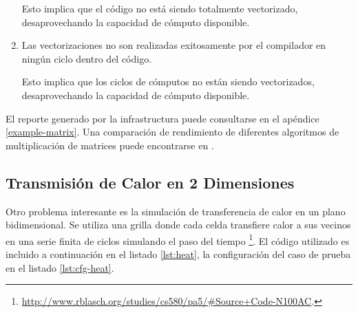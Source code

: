\documentclass[a4paper]{report}
\begin{document}
\begin{enumerate}
\smallskip

Esto implica que el código no está siendo totalmente vectorizado, desaprovechando la capacidad de cómputo disponible.

\item Las vectorizaciones no son realizadas exitosamente por el compilador en ningún ciclo dentro del código.

\smallskip

Esto implica que los ciclos de cómputos no están siendo vectorizados, desaprovechando la capacidad de cómputo disponible.

\end{enumerate}

El reporte generado por la infrastructura puede consultarse en el apéndice \ref{example-matrix}.
Una comparación de rendimiento de diferentes algoritmos de multiplicación de matrices puede encontrarse en \cite{mm-tool}.

\subsection{Transmisión de Calor en 2 Dimensiones}

Otro problema interesante es la simulación de transferencia de calor en un plano bidimensional.
Se utiliza una grilla donde cada celda transfiere calor a sus vecinos en una serie finita de ciclos simulando el paso del tiempo \footnote{\href{http://www.rblasch.org/studies/cs580/pa5/\#Source+Code-N100AC}{http://www.rblasch.org/studies/cs580/pa5/\#Source+Code-N100AC}.}. El código utilizado es incluido a continuación en el listado \ref{lst:heat}, la configuración del caso de prueba en el listado \ref{lst:cfg-heat}.

\bigskip
\end{document}
